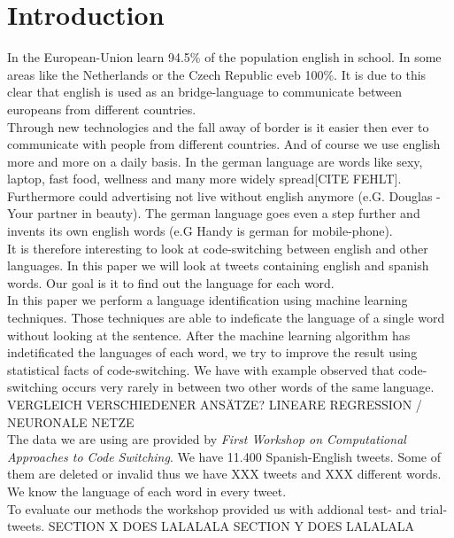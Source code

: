 \section{Introduction}\label{sec:Introduction}
In the European-Union learn 94.5\% of the population english in school. In some areas like the Netherlands or the Czech Republic eveb 100\%\cite{europa}. It is due to this clear that english is used as an bridge-language to communicate between europeans from different countries.  \\
Through new technologies and the fall away of border is it easier then ever to communicate with people from different countries. And of course we use english more and more on a daily basis. In the german language are words like sexy, laptop, fast food, wellness and many more widely spread[CITE FEHLT]. Furthermore could advertising not live without english anymore (e.G. Douglas - Your partner in beauty). The german language goes even a step further and invents its own english words (e.G Handy is german for mobile-phone).   \\
It is therefore interesting to look at code-switching between english and other languages. In this paper we will look at tweets containing english and spanish words. Our goal is it to find out the language for each word. \\
In this paper we perform a language identification using machine learning techniques. Those techniques are able to indeficate the language of a single word without looking at the sentence. After the machine learning algorithm has indetificated the languages of each word, we try to improve the result using statistical facts of code-switching. We have with example observed that code-switching occurs very rarely in between two other words of the same language.\\VERGLEICH VERSCHIEDENER ANSÄTZE? LINEARE REGRESSION /  NEURONALE NETZE
\\
The data we are using are provided by \textit{First Workshop on Computational Approaches to Code Switching}\cite{workshop}. We have 11.400 Spanish-English tweets. Some of them are deleted or invalid thus we have XXX tweets and XXX different words. We know the language of each word in every tweet. \\
To evaluate our methods the workshop\cite{workshop} provided us with addional test- and trial-tweets.
SECTION X DOES LALALALA SECTION Y DOES LALALALA


